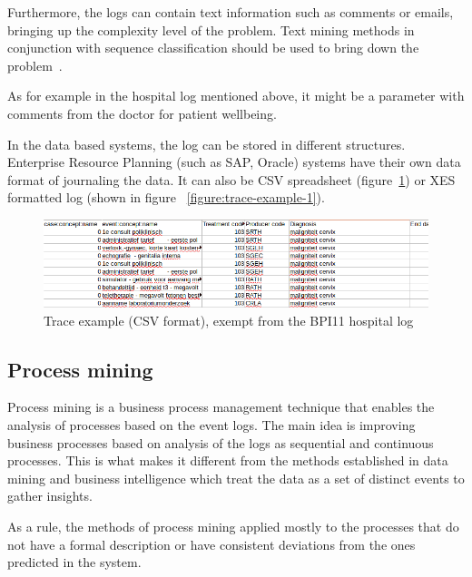Furthermore, the logs can contain text information such as comments or emails, bringing up the complexity level of the problem. Text mining methods in conjunction with sequence classification should be used to bring down the problem~\cite{DBLP:conf/bpm/TeinemaaDMF16}.

As for example in the hospital log mentioned above, it might be a parameter with comments from the doctor for patient wellbeing. 

In the data based systems, the log can be stored in different structures. Enterprise Resource Planning (such as SAP, Oracle) systems have their own data format of journaling the data. It can also be CSV spreadsheet (figure~\ref{figure:trace-example-2_csv}) or XES formatted log (shown in figure ~\ref{figure:trace-example-1}).  

\begin{figure}[!ht]
	\begin{center}  
		\includegraphics[width=\textwidth]{4_event_example_csv.png}
		\caption{Trace example (CSV format), exempt from the BPI11 hospital log~\cite{bpichallenge2011}}
		\label{figure:trace-example-2_csv}	
	\end{center}
\end{figure}



\subsection{Process mining}

Process mining is a business process management technique that enables the analysis of processes based on the event logs. The main idea is improving business processes based on analysis of the logs as sequential and continuous processes. This is what makes it different from the methods established in data mining and business intelligence which treat the data as a set of distinct events to gather insights. 

As a rule, the methods of process mining applied mostly to the processes that do not have a formal description or have consistent deviations from the ones predicted in the system. 


